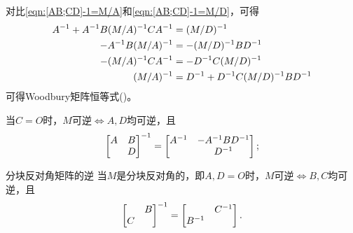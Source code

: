 \begin{corollary}
	对比\eqref{eqn:[AB;CD]-1=M/A}和\eqref{eqn:[AB;CD]-1=M/D}，可得
	\begin{subequations}
		\begin{align}
			A^{-1}+A^{-1} B(M/A)^{-1} CA^{-1}&=(M/D)^{-1}\\
			-A^{-1} B(M/A)^{-1}&=-(M/D)^{-1} BD^{-1}\\
			-(M/A)^{-1} CA^{-1}&=-D^{-1} C(M/D)^{-1}\\
			(M/A)^{-1}&=D^{-1}+D^{-1} C(M/D)^{-1} BD^{-1}
		\end{align}
	\end{subequations}
	可得Woodbury矩阵恒等式()。
\end{corollary}

\begin{corollary}
	当$C=O$时，$M$可逆$\iff A,D$均可逆，且
	\begin{equation}
		\begin{bmatrix}
			A&B\\ &D
		\end{bmatrix}^{-1}=\begin{bmatrix}
			A^{-1}&-A^{-1} BD^{-1}\\
			& D^{-1}
		\end{bmatrix};
	\end{equation}
\end{corollary}

\begin{theorem}
	{分块反对角矩阵的逆}{}
	当$M$是分块反对角的，即$A,D=O$时，$M$可逆$\iff B,C$均可逆，且
	\begin{equation}
		\begin{bmatrix}
			&B\\C
		\end{bmatrix}^{-1}=\begin{bmatrix}
			&C^{-1}\\B^{-1}
		\end{bmatrix}.
	\end{equation}
\end{theorem}


